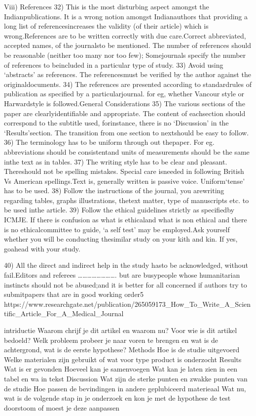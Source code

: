 Viii) References
32) This is the most disturbing aspect amongst the Indianpublications. It is a wrong notion amongst Indianauthors that providing a long list of referencesincreases the validity (of their article) which is wrong.References are to be written correctly with due care.Correct abbreviated, accepted names, of the journalsto be mentioned. The number of references should
be reasonable (neither too many nor too few); Somejournals specify the number of references to beincluded in a particular type of study.
33) Avoid using ‘abstracts’ as references.  The referencesmust be verified by the author against the originaldocuments.
34) The references are presented according to standardrules of publication as specified by a particularjournal. for eg, whether Vancour style or Harwardstyle is followed.General  Considerations
35) The various sections of the paper are clearlyidentifiable and appropriate. The content of eachsection should correspond to the subtitle used, forinstance, there is no ‘Discussion’ in the ‘Results’section. The transition from one section to nextshould be easy to follow.
36) The terminology has to be uniform through out thepaper. For eg.  abbreviations  should be consistentand units of measurements should be the same inthe text as in tables.
37) The writing style has to be clear and pleasant.  Thereshould not be spelling mistakes. Special care isneeded in following British Vs American spellings.Text is, generally written is passive voice.  Uniform‘tense’ has to be used.
38) Follow the instructions of the journal, you arewriting regarding tables, graphs illustrations, thetext matter, type of  manuscripts etc. to be used inthe article.
39) Follow the ethical guidelines strictly as specifiedby ICMJE. If there is confusion as what is ethicaland what is non ethical and there is no ethicalcommittee to guide, ‘a self test’ may be employed.Ask yourself whether you will be conducting thesimilar study  on your kith and kin. If yes, goahead with your study.

40)  All the direct and  indirect help in the study hasto be acknowledged, without fail.Editors and referees ……………………. but are busypeople whose humanitarian instincts should not be abused;and it is better for all concerned if authors try to submitpapers that are in good working order5 
https://www.researchgate.net/publication/265059173_How_To_Write_A_Scientific_Article_For_A_Medical_Journal

intriductie
Waarom chrijf je dit artikel en waarom nu?
Voor wie is dit artikel bedoeld?
Welk probleem probeer je naar voren te brengen en wat is de achtergrond, wat is de eerste hypothese?
Methods
Hoe is de studie uitgevoerd
Welke materialen zijn gebruikt of wat voor type product is onderzocht
Results
Wat is er gevonden
Hoeveel kan je samenvoegen
Wat kan je laten zien in een tabel en wa in tekst
Discussion
Wat zijn de sterke punten en zwakke punten van de studie
Hoe passen de bevindingen in andere geplubiceerd materieaal
Wat nu, wat is de volgende stap in je onderzoek en kon je met de hypothese de test doorstoom of moest je deze aanpassen

